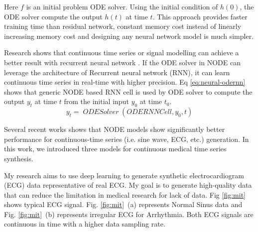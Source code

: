 \documentclass{article}
\DeclareMathOperator{\ODESOLVER}{\textit{ODESolver}}
\begin{document}
Here $f$ is an initial problem ODE solver. Using the initial condition of $h(0)$, the ODE solver compute the output $h(t)$ at time $t$. This approach provides faster training time than residual network, constant memory cost instead of linearly increasing memory cost and designing any neural network model is much simpler. 

Research shows that continuous time series or signal modelling can achieve a better result with recurrent neural network \cite{neil2016phased}. If the ODE solver in NODE can leverage the architecture of Recurrent neural network (RNN), it can learn continuous time series in real-time with higher precision\cite{habiba2020neural, habiba2020neuralode}. Eq \ref{eq:neural-odernn} shows that generic NODE based RNN cell \cite{habiba2020neural} is used by ODE solver to compute the output $y_t$ at time $t$ from the initial input $y_0$ at time $t_0$.
\begin{equation}
	y_{t} = \ODESOLVER(\textit{ODERNNCell},y_0, t)
	\label{eq:neural-odernn}
\end{equation}

Several recent works  \cite{habiba2020neural, habiba2020neuralode, che2018recurrent, rubanova2019latent, linial2020generative}shows that NODE models show significantly better performance for continuous-time series (i.e. sine wave, ECG, etc.) generation. In this work, we introduced three models for continuous medical time series synthesis.

My research aims to use deep learning to generate synthetic electrocardiogram (ECG) data representative of real ECG. My goal is to generate high-quality data that can reduce the limitation in medical research for lack of data. Fig \ref{fig:mit} shows typical ECG signal. Fig. \ref{fig:mit}~(a) represents Normal Sinus data and Fig. \ref{fig:mit}~(b) represents irregular ECG for Arrhythmia. Both ECG signals are continuous in time with a higher data sampling rate.  

\begin{figure*} [http]
  \label{fig:mit-normal}
\hfill
{}\label{fig:arr-mit}
\vfill
\caption{Loss analysis for training GAN model}
\label{fig:mit}
\end{figure*}
\end{document}
